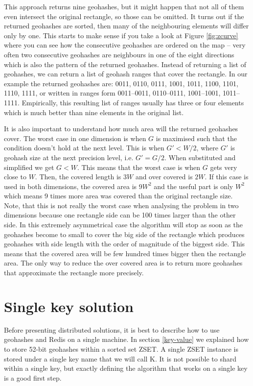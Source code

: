 \documentclass[times, utf8, diplomski]{fer}
\begin{document}
This approach returns nine geohashes, but it might happen that not all of them even intersect the original rectangle, so those can be omitted. It turns out if the returned geohashes are sorted, then many of the neighbouring elements will differ only by one. This starts to make sense if you take a look at Figure \ref{fig:zcurve} where you can see how the consecutive geohashes are ordered on the map -- very often two consecutive geohashes are neighbours in one of the eight directions which is also the pattern of the returned geohashes. Instead of returning a list of geohashes, we can return a list of geohash ranges that cover the rectangle. In our example the returned geohashes are: 0011, 0110, 0111, 1001, 1011, 1100, 1101, 1110, 1111, or written in ranges form 0011--0011, 0110--0111, 1001--1001, 1011--1111.
Empirically, this resulting list of ranges usually has three or four elements which is much better than nine elements in the original list.

It is also important to understand how much area will the returned geohashes cover. The worst case in one dimension is when $G$ is maximised such that the condition doesn't hold at the next level. This is when $G' < W/2$, where $G'$ is geohash size at the next precision level, i.e. $G' = G/2$. When substituted and simplified we get $G < W$. This means that the worst case is when $G$ gets very close to $W$. Then, the covered length is $3W$ and over covered is $2W$. If this case is used in both dimensions, the covered area is $9W^2$ and the useful part is only $W^2$ which means 9 times more area was covered than the original rectangle size. Note, that this is not really the worst case when analysing the problem in two dimensions because one rectangle side can be 100 times larger than the other side. In this extremely asymmetrical case the algorithm will stop as soon as the geohashes become to small to cover the big side of the rectangle which produces geohashes with side length with the order of magnitude of the biggest side. This means that the covered area will be few hundred times bigger then the rectangle area. The only way to reduce the over covered area is to return more geohashes that approximate the rectangle more precisely.

\section {Single key solution} \label {single_key}
Before presenting distributed solutions, it is best to describe how to use geohashes and Redis on a single machine. In section \ref{key-value} we explained how to store 52-bit geohashes within a sorted set ZSET. A single ZSET instance is stored under a single key name that we will call K. It is not possible to shard within a single key, but exactly defining the algorithm that works on a single key is a good first step.
\end{document}
